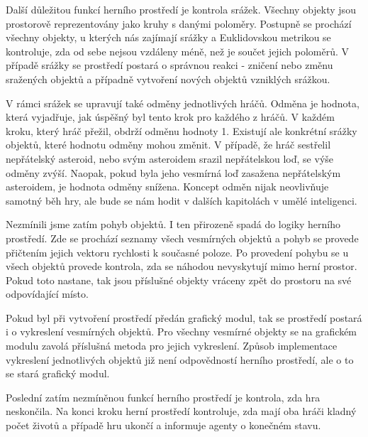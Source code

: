 \par
Další důležitou funkcí herního prostředí je kontrola srážek. Všechny objekty jsou prostorově reprezentovány jako kruhy s danými poloměry.
Postupně se prochází všechny objekty, u kterých nás zajímají srážky a Euklidovskou metrikou se kontroluje, zda od sebe nejsou vzdáleny méně, než je součet jejich poloměrů.
V případě srážky se prostředí postará o správnou reakci - zničení nebo změnu sražených objektů a případně vytvoření nových objektů vzniklých srážkou.

\par
V rámci srážek se upravují také odměny jednotlivých hráčů. Odměna je hodnota, která vyjadřuje, jak úspěšný byl tento krok pro každého z hráčů.
V každém kroku, který hráč přežil, obdrží odměnu hodnoty 1. Existují ale konkrétní srážky objektů, které hodnotu odměny mohou změnit.
V případě, že hráč sestřelil nepřátelský asteroid, nebo svým asteroidem srazil nepřátelskou loď, se výše odměny zvýší. 
Naopak, pokud byla jeho vesmírná loď zasažena nepřátelským asteroidem, je hodnota odměny snížena. 
Koncept odměn nijak neovlivňuje samotný běh hry, ale bude se nám hodit v dalších kapitolách v umělé inteligenci.

\par
Nezmínili jsme zatím pohyb objektů. I ten přirozeně spadá do logiky herního prostředí. 
Zde se prochází seznamy všech vesmírných objektů a pohyb se provede přičtením jejich vektoru rychlosti k současné poloze. Po provedení pohybu se u všech objektů provede kontrola, zda se náhodou nevyskytují mimo herní prostor. 
Pokud toto nastane, tak jsou příslušné objekty vráceny zpět do prostoru na své odpovídající místo.


\par
Pokud byl při vytvoření prostředí předán grafický modul, tak se prostředí postará i o vykreslení vesmírných objektů.
Pro všechny vesmírné objekty se na grafickém modulu zavolá příslušná metoda pro jejich vykreslení. 
Způsob implementace vykreslení jednotlivých objektů již není odpovědností herního prostředí, ale o to se stará grafický modul.

\par
Poslední zatím nezmíněnou funkcí herního prostředí je kontrola, zda hra neskončila. Na konci kroku herní prostředí kontroluje, zda mají oba hráči kladný počet životů a případě hru ukončí a informuje agenty o konečném stavu.

\par




